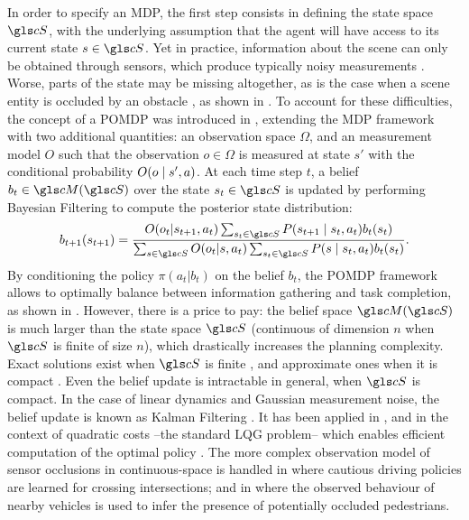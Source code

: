 In order to specify an \gls{MDP}, the first step consists in defining the state space $\cS$, with the underlying assumption that the agent will have access to its current state $s\in\cS$. Yet in practice, information about the scene can only be obtained through sensors, which produce typically noisy measurements \citep{Ulbrich2013,Du2010}. Worse, parts of the state may be missing altogether, as is the case when a scene entity is occluded by an obstacle \citep[\eg][]{Brechtel2013,Bouton2018,Sun2019}, as shown in . To account for these difficulties, the concept of a \gls{POMDP} was introduced in \citep{Astrom1965}, extending the MDP framework with two additional quantities: an observation space $\Omega$, and an measurement model $O$ such that the observation $o\in\Omega$ is measured at state $s'$ with the conditional probability $O\lparen o\mid s',a\rparen$. At each time step $t$, a belief $b_t\in\cM(\cS)$ over the state $s_t\in \cS$ is updated by performing Bayesian Filtering to compute the posterior state distribution:
\begin{equation*}
b_{t+1}(s_{t+1}) = \frac{O(o_t|s_{t+1}, a_t)\sum_{s_{t}\in\cS}P\parentheses{s_{t+1} \mid s_t, a_t}b_t(s_t)}{\sum_{s\in\cS} O(o_t|s, a_t)\sum_{s_{t}\in\cS}P\parentheses{s \mid s_t, a_t}b_t(s_t)}.
\end{equation*}
By conditioning the policy $\pi(a_t|b_t)$ on the belief $b_t$, the \gls{POMDP} framework allows to optimally balance between information gathering and task completion, as shown in . However, there is a price to pay: the belief space $\cM(\cS)$ is much larger than the state space $\cS$ (\eg continuous of dimension $n$ when $\cS$ is finite of size $n$), which drastically increases the planning complexity. Exact solutions exist when $\cS$ is finite \citep{Pineau2003}, and approximate ones when it is compact \citep{Porta2006,Silver2010}. Even the belief update is intractable in general, when $\cS$ is compact. In the case of linear dynamics and Gaussian measurement noise, the belief update is known as Kalman Filtering \citep{Kalman1960}. It has been applied in \citep[\eg]{Bry2011,Bouton2017,VanDenBerg2017}, and in the context of quadratic costs --\ie the standard LQG problem-- which enables efficient computation of the optimal policy \citep[see e.g.][]{Xu2014,VanDenBerg2011}. The more complex observation model of sensor occlusions in continuous-space is handled in \citep{Brechtel2013,Brechtel2014,Bouton2018} where cautious driving policies are learned for crossing intersections; and in \citep[][]{Sun2019} where the observed behaviour of nearby vehicles is used to infer the presence of potentially occluded pedestrians.
